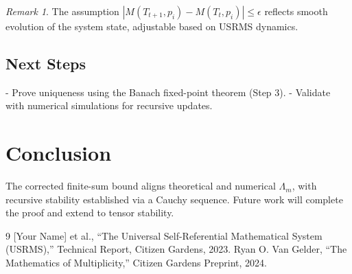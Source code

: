 \documentclass[11pt]{article}
\theoremstyle{definition}
\theoremstyle{remark}
\newtheorem{remark}{Remark}
\begin{document}
\begin{remark}
The assumption \( |M(T_{t+1}, p_i) - M(T_t, p_i)| \leq \epsilon \) reflects smooth evolution of the system state, adjustable based on USRMS dynamics.
\end{remark}

\subsection{Next Steps}
- Prove uniqueness using the Banach fixed-point theorem (Step 3).
- Validate with numerical simulations for recursive updates.

\section{Conclusion}
The corrected finite-sum bound aligns theoretical and numerical \( \Lambda_m \), with recursive stability established via a Cauchy sequence. Future work will complete the proof and extend to tensor stability.


\begin{thebibliography}{9}
[Your Name] et al., ``The Universal Self-Referential Mathematical System (USRMS),'' Technical Report, Citizen Gardens, 2023.
Ryan O. Van Gelder, ``The Mathematics of Multiplicity,'' Citizen Gardens Preprint, 2024.
\end{thebibliography}
\end{document}
